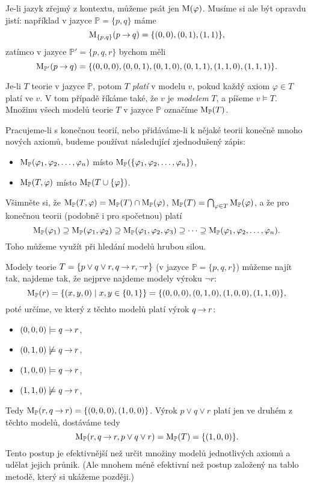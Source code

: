 Je-li jazyk zřejmý z kontextu, můžeme psát jen $\operatorname{M}(\varphi)$. Musíme si ale být opravdu jistí: například v jazyce $\mathbb P=\{p,q\}$ máme
$$
\operatorname{M}_{\{p,q\}}(p\mathbin{\rightarrow} q)=\{(0,0),(0,1),(1,1)\},$$
zatímco v jazyce $\mathbb P'=\{p,q,r\}$ bychom měli
$$
\operatorname{M}_{\mathbb P'}(p\mathbin{\rightarrow} q)=\{(0,0,0),(0,0,1),(0,1,0),(0,1,1),(1,1,0),(1,1,1)\}.
$$


\begin{definition}\label{definition:validity-of-theory}
    Je-li $T$ teorie v jazyce  $\mathbb P$, potom $T$ \emph{platí} v modelu $v$, pokud každý axiom $\varphi\in T$ platí ve $v$. V tom případě říkáme také, že $v$ je \emph{modelem} $T$, a píšeme $v\models T$. Množinu všech modelů teorie $T$ v jazyce $\mathbb P$ označíme $\operatorname{M}_\mathbb P(T)$.
\end{definition}

Pracujeme-li s konečnou teorií, nebo přidáváme-li k nějaké teorii konečně mnoho nových axiomů, budeme používat následující zjednodušený zápis:
\begin{itemize}
    \item $\operatorname{M}_\mathbb P(\varphi_1,\varphi_2,\dots,\varphi_n)$ místo $\operatorname{M}_\mathbb P(\{\varphi_1,\varphi_2,\dots,\varphi_n\})$,
    \item $\operatorname{M}_\mathbb P(T,\varphi)$ místo $\operatorname{M}_\mathbb P(T\cup\{\varphi\})$.
\end{itemize}

Všimněte si, že $\operatorname{M}_\mathbb P(T,\varphi)=\operatorname{M}_\mathbb P(T)\cap\operatorname{M}_\mathbb P(\varphi)$, $\operatorname{M}_\mathbb P(T)=\bigcap_{\varphi\in T}\operatorname{M}_\mathbb P(\varphi)$, a že pro konečnou teorii (podobně i pro spočetnou) platí
$$
\operatorname{M}_\mathbb P(\varphi_1)\supseteq \operatorname{M}_\mathbb P(\varphi_1,\varphi_2)\supseteq \operatorname{M}_\mathbb P(\varphi_1,\varphi_2,\varphi_3)\supseteq\dots\supseteq\operatorname{M}_\mathbb P(\varphi_1,\varphi_2,\dots,\varphi_n).
$$
Toho můžeme využít při hledání modelů hrubou silou.

\begin{example}
    Modely teorie $T=\{p\lor q\lor r, q\mathbin{\rightarrow} r, \neg r\}$ (v jazyce $\mathbb P=\{p,q,r\}$) můžeme najít tak, najdeme tak, že nejprve najdeme modely výroku $\neg r$:
    $$
    \operatorname{M}_\mathbb P(r)=\{(x,y,0)\mid x,y\in\{0,1\}\}=\{(0,0,0),(0,1,0),(1,0,0),(1,1,0)\},
    $$
    poté určíme, ve který z těchto modelů platí výrok $q\mathbin{\rightarrow} r$:
    \begin{itemize}
        \item $(0,0,0)\models q\mathbin{\rightarrow} r$,
        \item $(0,1,0)\not\models q\mathbin{\rightarrow} r$,
        \item $(1,0,0)\models q\mathbin{\rightarrow} r$,
        \item $(1,1,0)\not\models q\mathbin{\rightarrow} r$,
    \end{itemize}
    Tedy $\operatorname{M}_\mathbb P(r,q\mathbin{\rightarrow} r)=\{(0,0,0),(1,0,0)\}$. Výrok  $p\lor q\lor r$ platí jen ve druhém z těchto modelů, dostáváme tedy
    $$
    \operatorname{M}_\mathbb P(r,q\mathbin{\rightarrow} r,p\lor q\lor r)=\operatorname{M}_\mathbb P(T)=\{(1,0,0)\}.
    $$
    Tento postup je efektivnější než určit množiny modelů jednotlivých axiomů a udělat jejich průnik. (Ale mnohem méně efektivní než postup založený na tablo metodě, který si ukážeme později.)
\end{example}


